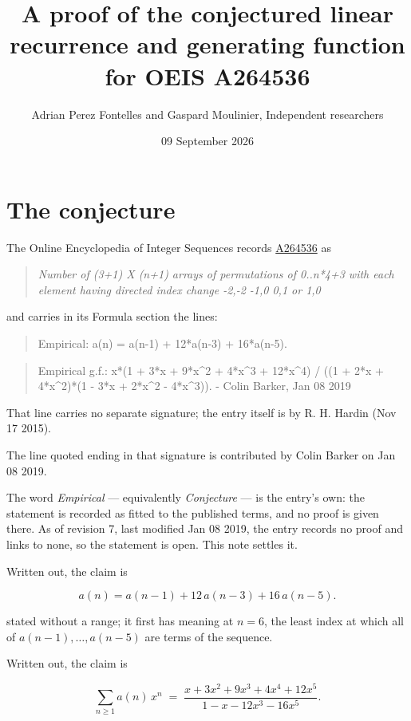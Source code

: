 \documentclass[11pt]{article}
\title{A proof of the conjectured linear recurrence and generating function for OEIS A264536}
\author{Adrian Perez Fontelles and Gaspard Moulinier, Independent researchers}
\date{09 September 2026}
\theoremstyle{definition}
\begin{document}
\maketitle
\section{The conjecture}

The Online Encyclopedia of Integer Sequences records \href{https://oeis.org/A264536}{A264536} as

\begin{quote}\itshape Number of (3+1) X (n+1) arrays of permutations of 0..n*4+3 with each element having directed index change -2,-2 -1,0 0,1 or 1,0\end{quote}

and carries in its Formula section the lines:

\begin{quote}\ttfamily Empirical: a(n) = a(n-1) + 12*a(n-3) + 16*a(n-5).\end{quote}

\begin{quote}\ttfamily Empirical g.f.: x*(1 + 3*x + 9*x\textasciicircum{}2 + 4*x\textasciicircum{}3 + 12*x\textasciicircum{}4) / ((1 + 2*x + 4*x\textasciicircum{}2)*(1 - 3*x + 2*x\textasciicircum{}2 - 4*x\textasciicircum{}3)). - Colin Barker, Jan 08 2019\end{quote}

That line carries no separate signature; the entry itself is by R. H. Hardin (Nov 17 2015).

The line quoted ending in that signature is contributed by Colin Barker on Jan 08 2019.

The word {\itshape Empirical} --- equivalently {\itshape Conjecture} --- is the entry's own: the statement is recorded as fitted to the published terms, and no proof is given there. As of revision 7, last modified Jan 08 2019, the entry records no proof and links to none, so the statement is open. This note settles it.

Written out, the claim is

\[a(n) = a(n-1) + 12\,a(n-3) + 16\,a(n-5).\]

stated without a range; it first has meaning at $n = 6$, the least index at which all of $a(n-1),\dots,a(n-5)$ are terms of the sequence.

Written out, the claim is

\[\sum_{n \ge 1} a(n)\,x^n \;=\; \frac{x + 3x^{2} + 9x^{3} + 4x^{4} + 12x^{5}}{1 - x - 12x^{3} - 16x^{5}}.\]
\end{document}
